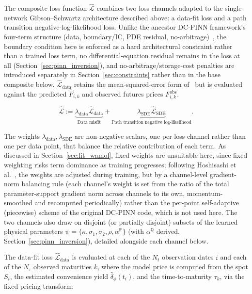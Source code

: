 \documentclass[11pt, a4paper]{article}
\begin{document}
The composite loss function $\hat{\mathcal{L}}$ combines two loss channels
adapted to the single-network Gibson–Schwartz architecture described above: a
data-fit loss and a path transition
negative-log-likelihood loss. Unlike the ancestor DC-PINN framework's four-term structure
(data, boundary/IC, PDE residual, no-arbitrage)~\cite{Hoshisashi2024Physics-InformedPDEs},
the boundary condition here is enforced as a hard architectural constraint
rather than a trained loss term, no differential-equation residual remains in
the loss at all (Section~\ref{sec:pinn_inversion}), and no-arbitrage/storage-cost
penalties are introduced separately in Section~\ref{sec:constraints} rather
than in the base composite below. $\hat{\mathcal{L}}_{\text{data}}$ retains the
mean-squared-error form of~\cite{Hoshisashi2024Physics-InformedPDEs} but is
evaluated against the predicted $\hat{F}_{i,k}$ and observed futures prices
$F^{\text{obs}}_{i,k}$.

\begin{equation}
\hat{\mathcal{L}} :=
\underbrace{\lambda_{\text{data}} \hat{\mathcal{L}}_{\text{data}}}_{\text{Data misfit}}
+ \underbrace{\lambda_{\text{SDE}} \hat{\mathcal{L}}_{\text{SDE}}}_{\text{Path transition negative log-likelihood}}.
\label{eq:composite}
\end{equation}

The weights $\lambda_{\text{data}}, \lambda_{\text{SDE}}$
are non-negative scalars, one per loss channel rather than one per data
point, that balance the relative contribution of each term. As discussed in
Section~\ref{sec:lit_wamol}, fixed weights are unsuitable here, since fixed
weighting risks term dominance as training progresses; following
Hoshisashi et al.~\cite{Hoshisashi2024Physics-InformedPDEs}, the weights are
adjusted during training, but by a channel-level gradient-norm balancing
rule (each channel's weight is set from the ratio of the total
parameter-support gradient norm across channels to its own, momentum-smoothed
and recomputed periodically) rather than the per-point self-adaptive
(piecewise) scheme of the original DC-PINN code, which is not used here.
The two channels also draw on disjoint (or partially disjoint) subsets of
the learned physical parameters $\psi = \{\kappa, \sigma_1, \sigma_2, \rho,
\alpha^{\mathbb{P}}\}$ (with $\alpha^{\mathbb{Q}}$ derived, Section~\ref{sec:pinn_inversion}), detailed alongside each channel
below.

The data-fit loss $\hat{\mathcal{L}}_{\text{data}}$ is evaluated at each of
the $N_t$ observation dates $i$ and each of the $N_\tau$ observed maturities
$k$, where the model price is computed from the spot $S_i$, the estimated
convenience yield $\hat{\delta}_\phi(t_i)$, and the time-to-maturity
$\tau_k$, via the fixed pricing transform:
\end{document}
